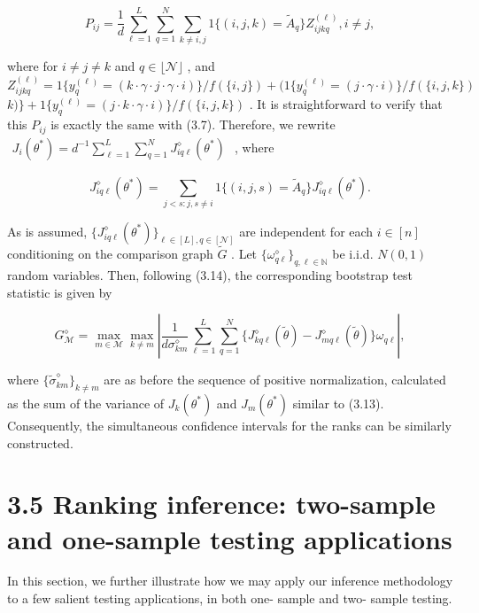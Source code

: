 \[
P_{ij} = \frac{1}{d} \sum_{\ell = 1}^{L} \sum_{q = 1}^{N} \sum_{k \neq i, j} 1\{(i,j,k) = \widetilde{A}_{q}\} Z_{ijkq}^{(\ell)}, i \neq j,
\]

where for \(i\neq j\neq k\) and \(q\in \lfloor \mathcal{N}\rfloor\) ,
and
\(Z_{i j k q}^{(\ell)} = 1\{y_{q}^{(\ell)} = (k\cdot \gamma \cdot j\cdot \gamma \cdot i)\} /f(\{i,j\}) + (1\{y_{q}^{(\ell)} = (j\cdot \gamma \cdot i)\} /f(\{i,j,k\})\)
\(k)\} +1\{y_{q}^{(\ell)} = (j\cdot k\cdot \gamma \cdot i)\} /f(\{i,j,k\})\)
. It is straightforward to verify that this \(P_{ij}\) is exactly the
same with (3.7). Therefore, we rewrite
\(\begin{array}{r}{J_{i}(\theta^{*}) = d^{- 1}\sum_{\ell = 1}^{L}\sum_{q = 1}^{N}J_{i q\ell}^{\diamond}(\theta^{*})} \end{array}\)
, where

\[
J_{iq\ell}^{\diamond}(\theta^{*}) = \sum_{j < s:j, s \neq i} 1\{(i,j,s) = \widetilde{A}_{q}\} J_{iq\ell}^{\diamond}(\theta^{*}). \tag{3.18}
\]

As is assumed,
\(\{J_{iq\ell}^{\diamond}(\theta^{*})\}_{\ell \in [L], q \in [\mathcal{N}]}\)
are independent for each \(i \in [n]\) conditioning on the comparison
graph \(\widetilde{G}\) . Let
\(\{\omega_{q\ell}^{\diamond}\}_{q, \ell \in \mathbb{N}}\) be i.i.d.
\(N(0,1)\) random variables. Then, following (3.14), the corresponding
bootstrap test statistic is given by

\[
G_{\mathcal{M}}^{\diamond} = \max_{m \in \mathcal{M}} \max_{k \neq m} \left| \frac{1}{d \sigma_{km}^{\diamond}} \sum_{\ell = 1}^{L} \sum_{q = 1}^{N} \{J_{kq\ell}^{\diamond}(\widetilde{\theta}) - J_{mq\ell}^{\diamond}(\widetilde{\theta})\} \omega_{q\ell} \right|,
\]

where \(\{\widetilde{\sigma}_{km}^{\diamond}\}_{k \neq m}\) are as
before the sequence of positive normalization, calculated as the sum of
the variance of \(J_{k}(\theta^{*})\) and \(J_{m}(\theta^{*})\) similar
to (3.13). Consequently, the simultaneous confidence intervals for the
ranks can be similarly constructed.

\section{3.5 Ranking inference: two-sample and one-sample testing
applications}\label{ranking-inference-two-sample-and-one-sample-testing-applications}

In this section, we further illustrate how we may apply our inference
methodology to a few salient testing applications, in both one- sample
and two- sample testing.

